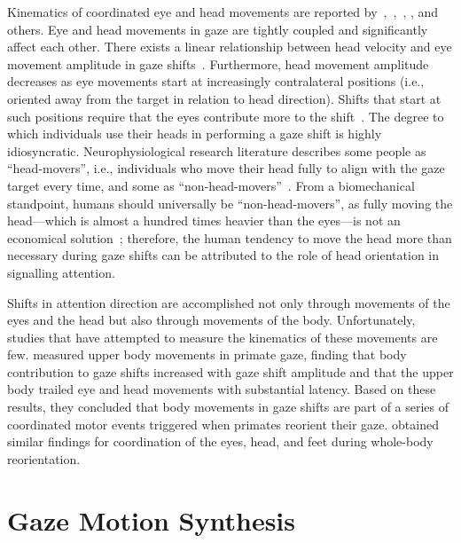 Kinematics of coordinated eye and head movements are reported by~\citet{guitton1987gaze},~\citet{freedman2000coordination},~\citet{barnes1979vor}, \citet{uemura1980eyehead}, and others. Eye and head movements in gaze are tightly coupled and significantly affect each other. There exists a linear relationship between head velocity and eye movement amplitude in gaze shifts~\citep{barnes1979vor,uemura1980eyehead}. Furthermore, head movement amplitude decreases as eye movements start at increasingly contralateral positions (i.e., oriented away from the target in relation to head direction). Shifts that start at such positions require that the eyes contribute more to the shift~\citep{mccluskey2007monkeys}. The degree to which individuals use their heads in performing a gaze shift is highly idiosyncratic. Neurophysiological research literature describes some people as ``head-movers'', i.e., individuals who move their head fully to align with the gaze target every time, and some as ``non-head-movers''~\citep{fuller1992head}. From a biomechanical standpoint, humans should universally be ``non-head-movers'', as fully moving the head---which is almost a hundred times heavier than the eyes---is not an economical solution~\citep{kim2007head}; therefore, the human tendency to move the head more than necessary during gaze shifts can be attributed to the role of head orientation in signalling attention.

Shifts in attention direction are accomplished not only through movements of the eyes and the head but also through movements of the body. Unfortunately, studies that have attempted to measure the kinematics of these movements are few. \citet{mccluskey2007monkeys} measured upper body movements in primate gaze, finding that body contribution to gaze shifts increased with gaze shift amplitude and that the upper body trailed eye and head movements with substantial latency. Based on these results, they concluded that body movements in gaze shifts are part of a series of coordinated motor events triggered when primates reorient their gaze. \citet{hollands2004wholebody} obtained similar findings for coordination of the eyes, head, and feet during whole-body reorientation.

\section{Gaze Motion Synthesis}

